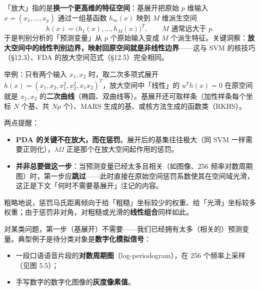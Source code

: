 \begin{remark}
「放大」指的是\textbf{换一个更高维的特征空间}：基展开把原始 $p$ 维输入 $x=(x_1,\dots,x_p)$ 通过一组基函数 $h_m(x)$ 映到 $M$ 维派生空间
\[
h(x) = \bigl(h_1(x),\dots,h_M(x)\bigr)^T,\qquad M \text{ 通常远大于 } p.
\]
于是判别分析的「预测变量」从 $p$ 个原始输入变成 $M$ 个派生特征。关键洞察：\textbf{放大空间中的线性判别边界，映射回原空间就是非线性边界}——这与 SVM 的核技巧（§12.3）、FDA 的放大空间范式（§12.5）完全相同。

举例：只有两个输入 $x_1,x_2$ 时，取二次多项式展开 $h(x)=(x_1,x_2,x_1^2,x_2^2,x_1x_2)^T$，放大空间中「线性」的 $u^T h(x)=0$ 在原空间就是 $x_1,x_2$ 的\textbf{二次曲线}（椭圆、双曲线等）。基展开还可取样条（加性样条每个坐标 $N$ 个基、共 $Np$ 个）、MARS 生成的基、或核方法生成的函数类（RKHS）。

两点提醒：
\begin{itemize}
\item \textbf{PDA 的关键不在放大，而在惩罚}。展开后的基集往往极大（同 SVM 一样需要正则化），$\lambda\Omega$ 正是那个在放大空间起作用的惩罚。
\item \textbf{并非总要做这一步}：当预测变量已经太多且相关（如图像、256 频率对数周期图）时，第一步应\textbf{跳过}——此时直接在原始空间惩罚系数使其在空间域光滑，这正是下文「何时不需要基展开」注记的内容。
\end{itemize}
\end{remark}

\begin{remark}[惩罚马氏距离的含义]
粗略地说，惩罚马氏距离倾向于给「粗糙」坐标较少的权重、给「光滑」坐标较多权重；由于惩罚非对角，对粗糙或光滑的\textbf{线性组合}同样如此。
\end{remark}

\begin{remark}[何时不需要基展开]
对某类问题，第一步（基展开）不需要——我们已经拥有太多（相关的）预测变量。典型例子是待分类对象是\textbf{数字化模拟信号}：

\begin{itemize}
\item 一段口语语音片段的\textbf{对数周期图}（log-periodogram），在 256 个频率上采样（见图 5.5）；
\item 手写数字的数字化图像的\textbf{灰度像素值}。
\end{itemize}
\end{remark}

